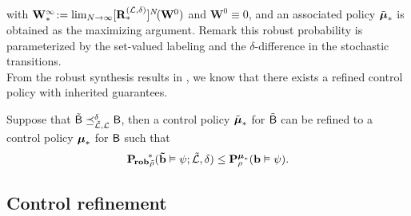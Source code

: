 \documentclass{ifacconf}
\begin{document}
with
$\mathbf W^\infty_\ast \!:=  \lim_{N\rightarrow\infty}[{\mathbf {R}}_\ast^{(\mathcal{L},\delta)}]^N\! (\mathbf W^0)$ and $\mathbf W^0\equiv0$, and an associated policy $\tilde {{\boldsymbol{\mu}}}_\ast$ is obtained as the maximizing argument. Remark this robust probability is parameterized by the set-valued labeling and the $\delta$-difference in the stochastic transitions.
\\
From the robust synthesis results in \citep{tech_report_TACAS},
we know  that there exists a refined control policy with inherited guarantees.
\begin{prop}\label{prop:1}
  Suppose that %
  $\tilde{\mathsf{B}}\preceq^{\delta}_{\tilde{\mathcal{L}},\mathcal{L}}  \mathsf{B}$, then a control policy ${\tilde {{\boldsymbol{\mu}}}}_\ast$ for $\tilde {\mathsf{B}}$ can be refined to a control policy ${\boldsymbol{\mu}}_\ast$ for $\mathsf{B}$ such that %
  \begin{equation}
  \label{eq:prob_result}
    \mathbf{P_{\! rob}}_{\tilde {\rho}}^{\!\ast}(\mathbf{\tilde b} \vDash\psi; \tilde{\mathcal{L}},\delta)\leq  \mathbf P _{\rho}^{{\boldsymbol{\mu}}_\ast}( \mathbf{b} \vDash\psi).
  \end{equation}
\end{prop}



\subsection{Control refinement}
\label{sec:control}
\end{document}
